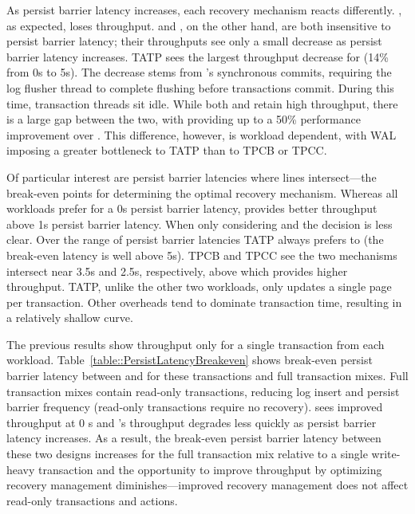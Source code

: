 As persist barrier latency increases, each recovery mechanism reacts differently.
\InPlace, as expected, loses throughput.
\NVDisk and \GroupCommit, on the other hand, are both insensitive to persist barrier latency; their throughputs see only a small decrease as persist barrier latency increases.
TATP sees the largest throughput decrease for \NVDisk (14\% from 0\textmu s to 5\textmu s).
The decrease stems from \NVDisk's synchronous commits, requiring the log flusher thread to complete flushing before transactions commit.
During this time, transaction threads sit idle.
While both \NVDisk and \GroupCommit retain high throughput, there is a large gap between the two, with \GroupCommit providing up to a 50\% performance improvement over \NVDisk.
This difference, however, is workload dependent, with WAL imposing a greater bottleneck to TATP than to TPCB or TPCC.

Of particular interest are persist barrier latencies where lines intersect---the break-even points for determining the optimal recovery mechanism.
Whereas all workloads prefer \InPlace for a 0\textmu s persist barrier latency, \GroupCommit provides better throughput above 1\textmu s persist barrier latency.
When only considering \InPlace and \NVDisk the decision is less clear.
Over the range of persist barrier latencies TATP always prefers \InPlace to \NVDisk (the break-even latency is well above 5\textmu s).
TPCB and TPCC see the two mechanisms intersect near 3.5\textmu s and 2.5\textmu s, respectively, above which \NVDisk provides higher throughput.
TATP, unlike the other two workloads, only updates a single page per transaction.
Other overheads tend to dominate transaction time, resulting in a relatively shallow \InPlace curve.



The previous results show throughput only for a single transaction from each workload.
Table~\ref{table::PersistLatencyBreakeven} shows break-even persist barrier latency between \NVDisk and \InPlace for these transactions and full transaction mixes.
Full transaction mixes contain read-only transactions, reducing log insert and persist barrier frequency (read-only transactions require no recovery).
\NVDisk sees improved throughput at 0 \textmu s and \InPlace's throughput degrades less quickly as persist barrier latency increases.
As a result, the break-even persist barrier latency between these two designs increases for the full transaction mix relative to a single write-heavy transaction and the opportunity to improve throughput by optimizing recovery management diminishes---improved recovery management does not affect read-only transactions and actions.

